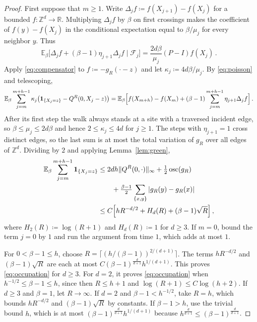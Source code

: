 \documentclass[11pt]{amsart}
\theoremstyle{plain}
\theoremstyle{definition}
\newcommand{\Z}{\mathbb Z}
\newcommand{\R}{\mathbb R}
\newcommand{\E}{\mathbb E}
\newcommand{\one}{\mathbf 1}
\begin{document}
	\begin{proof}
		First suppose that $m\geq1$. Write $\Delta_jf\coloneqq f(X_{j+1})-f(X_j)$ for a bounded
		$f\colon\Z^d\to\R$. Multiplying $\Delta_jf$ by $\beta$ on first
		crossings makes the coefficient of $f(y)-f(X_j)$ in the conditional
		expectation equal to $\beta/\mu_j$ for every neighbor $y$. Thus
		\begin{equation}\label{eq:compensator}
			\E_\beta\bigl[\Delta_jf+(\beta-1)\eta_{j+1}\Delta_jf\mid\mathcal F_j\bigr]
			=\frac{2d\beta}{\mu_j}(P-I)f(X_j)\, .
		\end{equation}
		Apply \eqref{eq:compensator} to $f\coloneqq-g_R(\cdot-z)$ and let
		$\kappa_j\coloneqq4d\beta/\mu_j$.  By \eqref{eq:poisson} and telescoping,
		\[
		\E_\beta\sum_{j=m}^{m+h-1}\kappa_j\bigl(\one_{\{X_j=z\}}-Q^R(0,X_j-z)\bigr)
		=\E_\beta\Bigl[f(X_{m+h})-f(X_m)
		+(\beta-1)\sum_{j=m}^{m+h-1}\eta_{j+1}\Delta_jf\Bigr]\, .
		\]
		After its first step the walk always stands at a site with a traversed
		incident edge, so $\beta\leq\mu_j\leq2d\beta$ and hence $2\leq \kappa_j\leq4d$ for $j\geq1$.
		The steps with $\eta_{j+1}=1$ cross distinct edges, so the last sum is at
		most the total variation of $g_R$ over all edges of $\Z^d$.  Dividing by
		$2$ and applying Lemma~\ref{lem:green},
		\begin{equation}\label{eq:optimize}
			\begin{aligned}
			\E_\beta\sum_{j=m}^{m+h-1}\one_{\{X_j=z\}}
			&\leq2dh\|Q^R(0,\cdot)\|_\infty+\tfrac12\operatorname{osc}(g_R)\\
			&\qquad+\tfrac{\beta-1}2\sum_{\{x,y\}}|g_R(y)-g_R(x)|\\
			&\leq C\Bigl[hR^{-d/2}+H_d(R)+(\beta-1)\sqrt R\Bigr]\, ,
			\end{aligned}
		\end{equation}
		where $H_2(R)\coloneqq\log(R+1)$ and $H_d(R)\coloneqq1$ for $d\geq3$.  If
		$m=0$, bound the term $j=0$ by $1$ and run the argument from time $1$,
		which adds at most $1$.

		For $0<\beta-1\leq h$, choose $R=\lceil(h/(\beta-1))^{2/(d+1)}\rceil$.
		The terms $hR^{-d/2}$ and $(\beta-1)\sqrt R$ are each at most
		$C(\beta-1)^{\frac{d}{d+1}}h^{1/(d+1)}$.
		This proves \eqref{eq:occupation} for $d\geq3$. For $d=2$, it proves
		\eqref{eq:occupation} when $h^{-1/2}\leq\beta-1\leq h$, since then
		$R\leq h+1$ and $\log(R+1)\leq C\log(h+2)$.  If $d\geq3$ and $\beta=1$, let $R\to\infty$.
		If $d=2$ and $\beta-1<h^{-1/2}$, take $R=h$, which bounds $hR^{-d/2}$ and $(\beta-1)\sqrt R$
		by constants. If $\beta-1>h$, use the trivial
		bound $h$, which is at most
		$(\beta-1)^{\frac{d}{d+1}}h^{1/(d+1)}$ because
		$h^{\frac{d}{d+1}}\leq(\beta-1)^{\frac{d}{d+1}}$.

	\end{proof}
\end{document}
